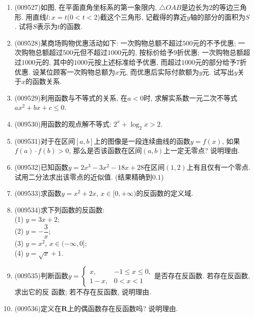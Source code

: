 \documentclass[10pt,a4paper]{article}
\begin{document}
\begin{enumerate}[1.]
\item {\tiny (009527)}如图, 在平面直角坐标系的第一象限内, $\triangle OAB$是边长为$2$的等边三角形. 用直线$l: x=t$($0<t<2$)截这个三角形, 记截得的靠近$y$轴的部分的面积为$S$. 试将$S$表示为$t$的函数.
\begin{center}
\end{center}
\item {\tiny (009528)}某商场购物优惠活动如下: 一次购物总额不超过$500$元的不予优惠; 一次购物总额超过$500$元但不超过$1000$元的, 按标价给予$9$折优惠; 一次购物总额超过$1000$元的, 其中的$1000$元按上述标准给予优惠, 而超过$1000$元的部分给予$7$折优惠. 设某位顾客一次购物总额为$x$元, 而优惠后实际付款额为$y$元. 试写出$y$关于$x$的函数关系.
\item {\tiny (009529)}利用函数与不等式的关系, 在$a<0$时, 求解实系数一元二次不等式$ax^2+bx+c\le 0$.
\item {\tiny (009530)}用函数的观点解不等式: $2^x+\log_2x>2$.
\item {\tiny (009531)}对于在区间$[a, b]$上的图像是一段连续曲线的函数$y=f(x)$, 如果$f(a)\cdot f(b)>0$, 那么是否该函数在区间$(a, b)$上一定无零点? 说明理由.
\item {\tiny (009532)}已知函数$y=2x^3-3x^2-18x+28$在区间$(1, 2)$上有且仅有一个零点. 试用二分法求出该零点的近似值. (结果精确到$0.1$)
\item {\tiny (009533)}求函数$y=x^2+2x$, $x\in [0, +\infty)$的反函数的定义域.
\item {\tiny (009534)}求下列函数的反函数:\\
(1) $y=3x+2$;\\
(2) $y=-\dfrac 3x$;\\
(3) $y=x^2$, $x\in (-\infty, 0]$;\\
(4) $y=\sqrt x+1$.
\item {\tiny (009535)}判断函数$y=\begin{cases}x, & -1\le x\le 0, \\ 1-x, & 0<x<1\end{cases}$是否存在反函数. 若存在反函数, 求出它的反
函数; 若不存在反函数, 说明理由.
\item {\tiny (009536)}定义在$\mathbf{R}$上的偶函数存在反函数吗? 说明理由.

\end{enumerate}
\end{document}
